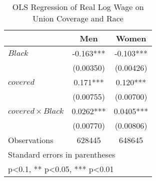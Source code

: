 \begin{table}[htbp]\centering
\def\sym#1{\ifmmode^{#1}\else\(^{#1}\)\fi}
\caption{OLS Regression of Real Log Wage on Union Coverage and Race}
\begin{tabular}{l*{2}{c}}
\hline\hline
                    &\multicolumn{1}{c}{Men}&\multicolumn{1}{c}{Women}\\
\hline
$ Black $           &      -0.163***&      -0.103***\\
                    &   (0.00350)   &   (0.00426)   \\
[1em]
$ covered $         &       0.171***&       0.120***\\
                    &   (0.00755)   &   (0.00700)   \\
[1em]
$ covered \times Black $&      0.0262***&      0.0405***\\
                    &   (0.00770)   &   (0.00806)   \\
\hline
Observations        &      628445   &      648645   \\
\hline\hline
\multicolumn{3}{l}{\footnotesize Standard errors in parentheses}\\
\multicolumn{3}{l}{\footnotesize * p<0.1, ** p<0.05, *** p<0.01}\\
\end{tabular}
\end{table}
